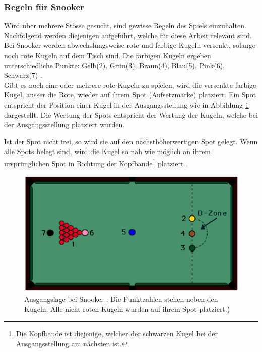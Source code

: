 \subsubsection{Regeln für Snooker}\label{kap:tiefensuche:regeln_fuer_snooker}
Wird über mehrere Stösse gesucht, sind gewisse Regeln des Spiels einzuhalten.
Nachfolgend werden diejenigen aufgeführt, welche für diese Arbeit relevant sind.
Bei Snooker werden abwechslungsweise rote und farbige Kugeln versenkt, solange noch rote Kugeln auf dem Tisch sind.
Die farbigen Kugeln ergeben unterschiedliche Punkte: Gelb(2), Grün(3), Braun(4), Blau(5), Pink(6), Schwarz(7) \cite{stoppball:spielregel:snooker}.\\
Gibt es noch eine oder mehrere rote Kugeln zu spielen, wird die versenkte farbige Kugel, ausser die Rote, wieder
auf ihrem Spot (Aufsetzmarke) platziert.
Ein Spot entspricht der Position einer Kugel in der Ausgangsstellung wie in Abbildung \ref{fig:snooker_ausgangslage} dargestellt.
Die Wertung der Spots entspricht der Wertung der Kugeln, welche bei der Ausgangsstellung platziert wurden.

Ist der Spot nicht frei, so wird sie auf den nächsthöherwertigen Spot gelegt.
Wenn alle Spots belegt sind, wird die Kugel so nah wie möglich an ihrem ursprünglichen
Spot in Richtung der Kopfbande\footnote{Die Kopfbande ist diejenige, welcher der schwarzen Kugel bei der Ausgangsstellung am
nächsten ist.} platziert \cite{stoppball:spielregel:snooker}.

\begin{figure}[h!]
    \begin{center}
        \includegraphics[width=0.4\linewidth]{../common/03_billiard_ai/resources/39_snooker_ausgangslage.png}
    \end{center}
    \caption{Ausgangslage bei Snooker \cite{stoppball:spielregel:snooker}:
    Die Punktzahlen stehen neben den Kugeln.
    Alle nicht roten Kugeln wurden auf ihrem Spot platziert.)
    }
    \label{fig:snooker_ausgangslage}
\end{figure}

